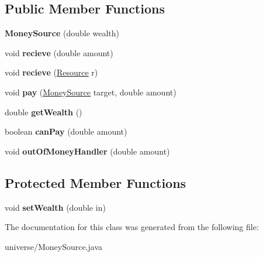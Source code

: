 \subsection*{Public Member Functions}
\begin{DoxyCompactItemize}
\item 
{\bfseries Money\+Source} (double wealth)\hypertarget{classuniverse_1_1_money_source_a6a84a055ba548168ed2951a340d0c95e}{}\label{classuniverse_1_1_money_source_a6a84a055ba548168ed2951a340d0c95e}

\item 
void {\bfseries recieve} (double amount)\hypertarget{classuniverse_1_1_money_source_a267e665f0efcf81aaabd8dff3e0a1ac6}{}\label{classuniverse_1_1_money_source_a267e665f0efcf81aaabd8dff3e0a1ac6}

\item 
void {\bfseries recieve} (\hyperlink{classuniverse_1_1_resource}{Resource} r)\hypertarget{classuniverse_1_1_money_source_a099a1ed62fe35053022010d70b39f256}{}\label{classuniverse_1_1_money_source_a099a1ed62fe35053022010d70b39f256}

\item 
void {\bfseries pay} (\hyperlink{classuniverse_1_1_money_source}{Money\+Source} target, double amount)\hypertarget{classuniverse_1_1_money_source_a62376409f1ae0533fc9cb031642c8457}{}\label{classuniverse_1_1_money_source_a62376409f1ae0533fc9cb031642c8457}

\item 
double {\bfseries get\+Wealth} ()\hypertarget{classuniverse_1_1_money_source_aec2346fb5ecca326981e39881e2c278c}{}\label{classuniverse_1_1_money_source_aec2346fb5ecca326981e39881e2c278c}

\item 
boolean {\bfseries can\+Pay} (double amount)\hypertarget{classuniverse_1_1_money_source_a331627b80d9953b4b83caebdaad1c840}{}\label{classuniverse_1_1_money_source_a331627b80d9953b4b83caebdaad1c840}

\item 
void {\bfseries out\+Of\+Money\+Handler} (double amount)\hypertarget{classuniverse_1_1_money_source_a96cb35fc384d4467994c4238d003c0f8}{}\label{classuniverse_1_1_money_source_a96cb35fc384d4467994c4238d003c0f8}

\end{DoxyCompactItemize}
\subsection*{Protected Member Functions}
\begin{DoxyCompactItemize}
\item 
void {\bfseries set\+Wealth} (double in)\hypertarget{classuniverse_1_1_money_source_adeac3dabb4c6b23e51c60f299a951e09}{}\label{classuniverse_1_1_money_source_adeac3dabb4c6b23e51c60f299a951e09}

\end{DoxyCompactItemize}


The documentation for this class was generated from the following file\+:\begin{DoxyCompactItemize}
\item 
universe/Money\+Source.\+java\end{DoxyCompactItemize}
